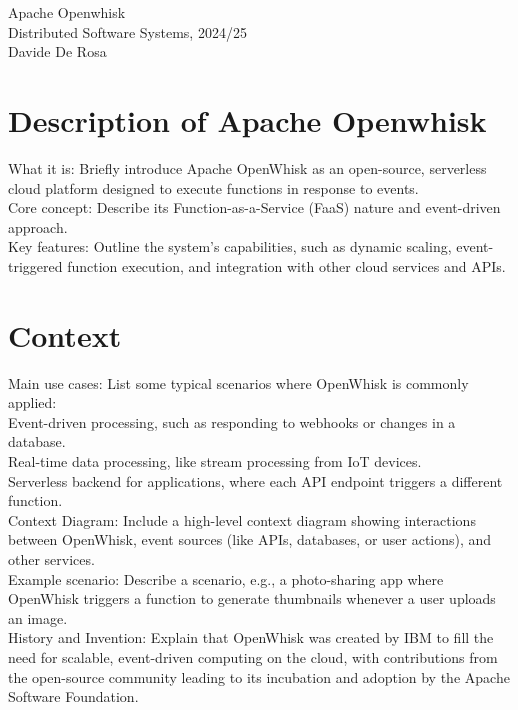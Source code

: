 \documentclass[12pt]{article}
\begin{document}
\begin{center}
\LARGE
Apache Openwhisk \vspace{10pt}\\
\Large
Distributed Software Systems, 2024/25 \vspace{10pt}\\
\large
Davide De Rosa
\end{center}

\section{Description of Apache Openwhisk}
What it is: Briefly introduce Apache OpenWhisk as an open-source, serverless cloud platform designed to execute functions in response to events.\\
Core concept: Describe its Function-as-a-Service (FaaS) nature and event-driven approach.\\
Key features: Outline the system’s capabilities, such as dynamic scaling, event-triggered function execution, and integration with other cloud services and APIs.

\section{Context}
Main use cases: List some typical scenarios where OpenWhisk is commonly applied:\\
Event-driven processing, such as responding to webhooks or changes in a database.\\
Real-time data processing, like stream processing from IoT devices.\\
Serverless backend for applications, where each API endpoint triggers a different function.\\
Context Diagram: Include a high-level context diagram showing interactions between OpenWhisk, event sources (like APIs, databases, or user actions), and other services.\\
Example scenario: Describe a scenario, e.g., a photo-sharing app where OpenWhisk triggers a function to generate thumbnails whenever a user uploads an image.\\
History and Invention: Explain that OpenWhisk was created by IBM to fill the need for scalable, event-driven computing on the cloud, with contributions from the open-source community leading to its incubation and adoption by the Apache Software Foundation.
\end{document}
